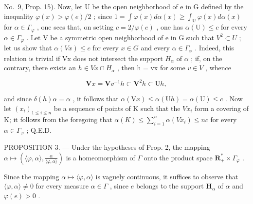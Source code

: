 No.~9, Prop. 15). Now, let U be the open neighborhood of e in G defined by the inequality \(\varphi(x) > \varphi(e)/2\) ; since \(1 = \int \varphi(x) d\alpha(x) \geqslant \int_{\mathrm{U}} \varphi(x) d\alpha(x)\) for \(\alpha \in \Gamma_{\varphi}\) , one sees that, on setting \(c = 2/\varphi(e)\) , one has \(\alpha(\mathrm{U}) \leqslant c\) for every \(\alpha \in \Gamma_{\varphi}\) . Let V be a symmetric open neighborhood of e in G such that \(V^{2} \subset U\) ; let us show that \(\alpha(Vx) \leqslant c\) for every \(x \in G\) and every \(\alpha \in \Gamma_{\varphi}\) . Indeed, this relation is trivial if Vx does not intersect the support \(H_{\alpha}\) of \(\alpha\) ; if, on the contrary, there exists an \(h \in Vx \cap H_{\alpha}\) , then h = vx for some \(v \in V\) , whence

\[
\mathbf {V} x = \mathbf {V} v ^ {- 1} h \subset \mathbf {V} ^ {2} h \subset \mathrm{U} h,
\]

and since \(\delta(h)\alpha = \alpha\) , it follows that \(\alpha(\mathrm{V}x) \leqslant \alpha(\mathrm{U}h) = \alpha(\mathrm{U}) \leqslant c\) . Now let \((x_i)_{1 \leqslant i \leqslant n}\) be a sequence of points of K such that the \(Vx_i\) form a covering of K; it follows from the foregoing that \(\alpha(K) \leqslant \sum_{i=1}^{n} \alpha(Vx_i) \leqslant nc\) for every \(\alpha \in \Gamma_\varphi\) ; Q.E.D.

PROPOSITION 3. --- Under the hypotheses of Prop. 2, the mapping \(\alpha \mapsto \left( \langle \varphi, \alpha \rangle, \frac{\alpha}{\langle \varphi, \alpha \rangle} \right)\) is a homeomorphism of \(\Gamma\) onto the product space \(\mathbf{R}_{+}^{*} \times \Gamma_{\varphi}\) .

Since the mapping \(\alpha \mapsto \langle \varphi, \alpha \rangle\) is vaguely continuous, it suffices to observe that \(\langle \varphi, \alpha \rangle \neq 0\) for every measure \(\alpha \in \Gamma\) , since \(e\) belongs to the support \(\mathbf{H}_{\alpha}\) of \(\alpha\) and \(\varphi(e) > 0\) .

